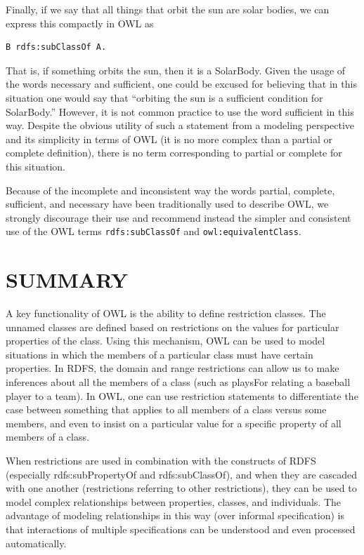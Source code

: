Finally, if we say that all things that orbit the sun are solar bodies,
we can express this compactly in
OWL as

\begin{lstlisting}
B rdfs:subClassOf A.
\end{lstlisting}

That is, if something orbits the sun, then it is a SolarBody. Given the
usage of the words necessary and sufficient, one could be excused for
believing that in this situation one would say that ``orbiting the sun
is a sufficient condition for SolarBody.'' However, it is not common
practice to use the word sufficient in this way. Despite the obvious
utility of such a statement from a modeling perspective and its
simplicity in terms of OWL (it is no more complex than a partial or
complete definition), there is no term corresponding to partial or
complete for this situation.

Because of the incomplete and inconsistent way the words partial,
complete, sufficient, and necessary have been traditionally used to
describe OWL, we strongly discourage their use and recommend instead the
simpler and consistent use of the OWL terms \texttt{rdfs:subClassOf} and
\texttt{owl:equivalentClass}.

\section{SUMMARY}

A key functionality of OWL is the ability to define restriction classes.
The unnamed classes are defined based on restrictions on the values for
particular properties of the class. Using this mechanism, OWL can be
used to model situations in which the members of a particular class must
have certain properties. In RDFS, the domain and range restrictions can
allow us to make inferences about all the members of a class (such as
playsFor relating a baseball player to a team). In OWL, one can use
restriction statements to differentiate the case between something that
applies to all members of a class versus some members, and even to
insist on a particular value for a specific property of all members of a
class.

When restrictions are used in combination with the constructs of RDFS
(especially rdfs:subPropertyOf and rdfs:subClassOf), and when they are
cascaded with one another (restrictions referring to other
restrictions), they can be used to model complex relationships between
properties, classes, and individuals. The advantage of modeling
relationships in this way (over informal specification) is that
interactions of multiple specifications can be understood and even
processed automatically.


